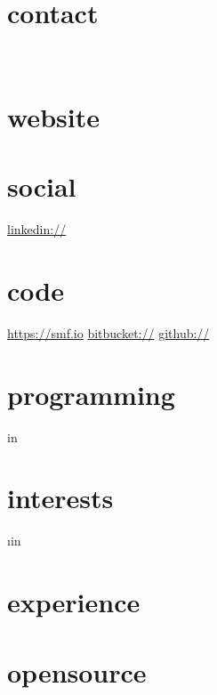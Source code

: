 \documentclass[]{fancy-cv}
\begin{document}
\header{\MakeLowercase\myfirstname}{\MakeLowercase\mylastname}{\MakeLowercase\mytitle}

\begin{aside}
  \section{contact}
    \href{mailto:\myemail}{\myemail}
    ~
    \myphone
    ~
    \myaddress%
    \mycity
  \section{website}
    \href{\mywebsite}{\mywebsite}
  \section{social}
    \href{http://www.linkedin.com/in/\mylinkedin}{linkedin://\mylinkedin}
  \section{code}
    \href{https://smf.io}{https://smf.io}
    \href{https://bitbucket.org/\myfb}{bitbucket://\myfb}
    \href{https://github.com/\myfb}{github://\myfb}
  \section{programming}
     \lang in \programming {%
      \lang
    }%
  \section{interests}
     \i in \interests {%
      \MakeLowercase\i
    }%
\end{aside}

\section{experience}
\label{sec:experience}


\vspace{-2em}
\section{opensource}
\end{document}
